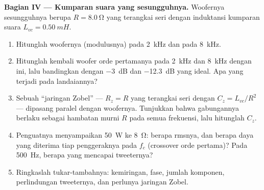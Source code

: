 \begin{problem}
\medskip
\noindent\textbf{Bagian IV --- Kumparan suara yang sesungguhnya.}
Woofernya sesungguhnya berupa $R = \qty{8.0}{\ohm}$ yang terangkai seri
dengan induktansi kumparan suara $L_{vc} = \qty{0.50}{mH}$.
\begin{enumerate}[resume]
  \item Hitunglah  woofernya (modulusnya) pada \qty{2}{kHz} dan
        pada \qty{8}{kHz}.
  \item Hitunglah kembali  woofer orde pertamanya pada
        \qty{2}{kHz} dan \qty{8}{kHz} dengan  ini, lalu
        bandingkan dengan \qty{-3}{dB} dan \qty{-12.3}{dB} yang ideal.
        Apa yang terjadi pada landaiannya?
  \item Sebuah ``jaringan Zobel'' --- $R_z = R$ yang terangkai seri
        dengan $C_z =
        L_{vc}/R^2$ --- dipasang paralel dengan woofernya.
        Tunjukkan bahwa gabungannya berlaku sebagai hambatan murni $R$
        pada semua frekuensi, lalu hitunglah $C_z$.
  \item Penguatnya menyampaikan \qty{50}{W} ke \qty{8}{\ohm}: berapa
         rmsnya, dan berapa daya yang diterima tiap penggeraknya
        pada $f_c$ (crossover orde pertama)? Pada \qty{500}{Hz}, berapa
        yang mencapai tweeternya?
  \item Ringkaslah tukar-tambahnya: kemiringan, fase, jumlah komponen,
        perlindungan tweeternya, dan perlunya jaringan Zobel.
\end{enumerate}
\end{problem}

